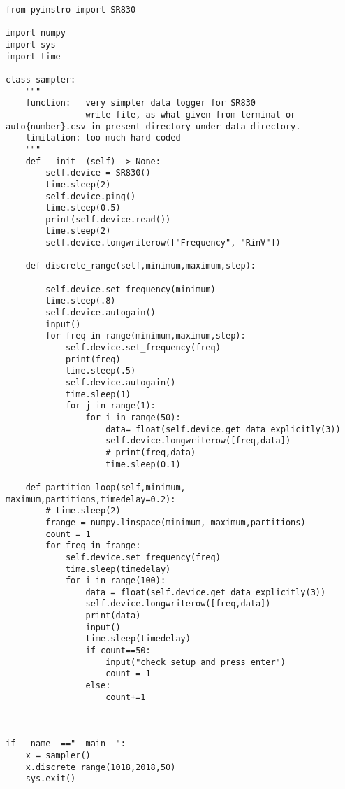 \begin{verbatim}
from pyinstro import SR830

import numpy
import sys
import time

class sampler:
    """
    function:   very simpler data logger for SR830
                write file, as what given from terminal or auto{number}.csv in present directory under data directory.
    limitation: too much hard coded
    """
    def __init__(self) -> None:
        self.device = SR830()
        time.sleep(2)
        self.device.ping()
        time.sleep(0.5)
        print(self.device.read())
        time.sleep(2)
        self.device.longwriterow(["Frequency", "RinV"])

    def discrete_range(self,minimum,maximum,step):
        
        self.device.set_frequency(minimum)
        time.sleep(.8)
        self.device.autogain()
        input()
        for freq in range(minimum,maximum,step):
            self.device.set_frequency(freq)
            print(freq)
            time.sleep(.5)
            self.device.autogain()
            time.sleep(1)
            for j in range(1):
                for i in range(50):
                    data= float(self.device.get_data_explicitly(3))
                    self.device.longwriterow([freq,data])
                    # print(freq,data)
                    time.sleep(0.1)

    def partition_loop(self,minimum, maximum,partitions,timedelay=0.2):
        # time.sleep(2)
        frange = numpy.linspace(minimum, maximum,partitions)
        count = 1
        for freq in frange:
            self.device.set_frequency(freq)
            time.sleep(timedelay)
            for i in range(100):
                data = float(self.device.get_data_explicitly(3))
                self.device.longwriterow([freq,data])
                print(data)
                input()
                time.sleep(timedelay)
                if count==50:
                    input("check setup and press enter")
                    count = 1
                else:
                    count+=1

    

if __name__=="__main__":
    x = sampler()
    x.discrete_range(1018,2018,50)
    sys.exit()
\end{verbatim}
            
